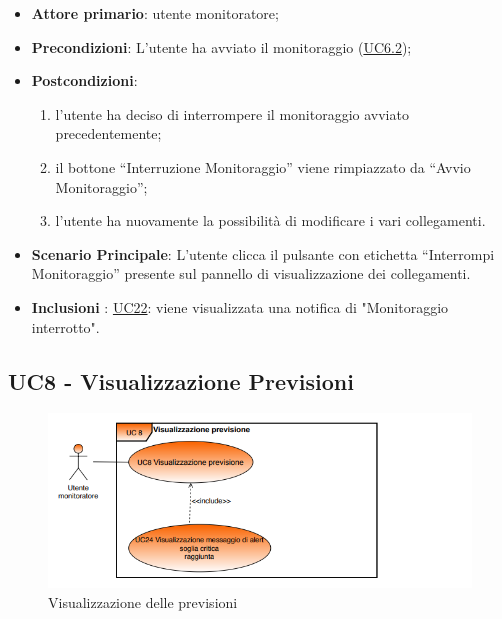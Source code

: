 		\begin{itemize}
			\item\textbf{Attore primario}: utente monitoratore;
			\item\textbf{Precondizioni}: L’utente ha avviato il monitoraggio (\hyperref[par:UC6.2]{UC6.2});
			\item\textbf{Postcondizioni}:
				\begin{enumerate}
					\item l’utente ha deciso di interrompere il monitoraggio avviato precedentemente; 
					\item il bottone “Interruzione Monitoraggio” viene rimpiazzato da “Avvio Monitoraggio”;
					\item l’utente ha nuovamente la possibilità di modificare i vari collegamenti. 
				\end{enumerate}	
			\item\textbf{Scenario Principale}: L’utente clicca il pulsante con etichetta “Interrompi Monitoraggio” presente sul pannello di visualizzazione dei collegamenti.
			\item\textbf{Inclusioni }: \hyperref[par:UC22]{UC22}: viene visualizzata una notifica di "Monitoraggio interrotto".		
		\end{itemize}


	\label{par:UC8}
	\subsection{UC8 - Visualizzazione Previsioni}

	\begin{figure}[H]
		\centering
		\includegraphics[scale=0.80]{../Analisi_dei_requisiti/img/Diagrammi_UML/UC8_Visualizzazione_previsioni.png}
		\caption{Visualizzazione delle previsioni}
	\end{figure}

